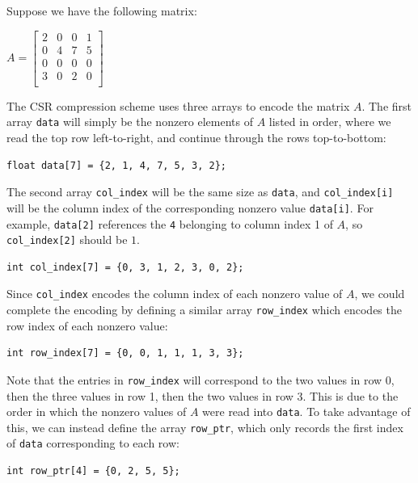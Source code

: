 \documentclass{article}
\theoremstyle{definition}
\begin{document}
Suppose we have the following matrix:
\begin{center}
$A = 
\begin{bmatrix}
2 & 0 & 0 & 1 \\
0 & 4 & 7 & 5 \\
0 & 0 & 0 & 0 \\
3 & 0 & 2 & 0 \\
\end{bmatrix}$
\end{center}

The CSR compression scheme uses three arrays to encode the matrix $A$.
The first array \texttt{data} will simply be the nonzero elements of $A$ listed in order, where we read the top row left-to-right, and continue through the rows top-to-bottom:

\begin{verbatim}
float data[7] = {2, 1, 4, 7, 5, 3, 2};
\end{verbatim}

The second array \texttt{col\_index} will be the same size as \texttt{data}, and \texttt{col\_index[i]} will be the column index of the corresponding nonzero value \texttt{data[i]}. For example, \texttt{data[2]} references the \texttt{4} belonging to column index 1 of $A$, so \texttt{col\_index[2]} should be $1$.

\begin{verbatim}
int col_index[7] = {0, 3, 1, 2, 3, 0, 2};
\end{verbatim}

Since \texttt{col\_index} encodes the column index of each nonzero value of $A$, we could complete the encoding by defining a similar array \texttt{row\_index} which encodes the row index of each nonzero value:

\begin{verbatim}
int row_index[7] = {0, 0, 1, 1, 1, 3, 3};
\end{verbatim}

Note that the entries in \texttt{row\_index} will correspond to the two values in row 0, then the three values in row 1, then the two values in row 3. This is due to the order in which the nonzero values of $A$ were read into \texttt{data}. To take advantage of this, we can instead define the array \texttt{row\_ptr}, which only records the first index of \texttt{data} corresponding to each row:

\begin{verbatim}
int row_ptr[4] = {0, 2, 5, 5};
\end{verbatim}
\end{document}
